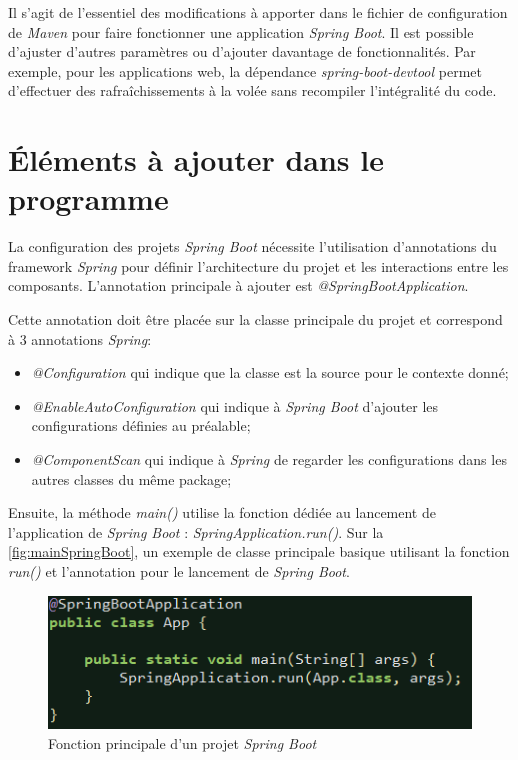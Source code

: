 \documentclass{polytech/polytech}
\begin{document}
Il s’agit de l’essentiel des modifications à apporter dans le fichier de configuration de \textit{Maven} pour faire fonctionner une application \textit{Spring Boot}. Il est possible d’ajuster d’autres paramètres ou d’ajouter davantage de fonctionnalités. Par exemple, pour les applications web, la dépendance \textit{spring-boot-devtool} permet d’effectuer des rafraîchissements à la volée sans recompiler l’intégralité du code. 


\section{Éléments à ajouter dans le programme}
\label{sec:elementsSpringBoot}

La configuration des projets \textit{Spring Boot} nécessite l’utilisation d’annotations du framework \textit{Spring} pour définir l’architecture du projet et les interactions entre les composants. L’annotation principale à ajouter est \textit{@SpringBootApplication}.


Cette annotation doit être placée sur la classe principale du projet et correspond à 3 annotations \textit{Spring}:
\begin{itemize}
	\item \textit{@Configuration} qui indique que la classe est la source pour le contexte donné;
	\item \textit{@EnableAutoConfiguration} qui indique à \textit{Spring Boot} d’ajouter les configurations définies au préalable;
	\item \textit{@ComponentScan} qui indique à \textit{Spring} de regarder les configurations dans les autres classes du même package;
\end{itemize}

Ensuite, la méthode \textit{main()} utilise la fonction dédiée au lancement de l’application de \textit{Spring Boot} : \textit{SpringApplication.run()}. Sur la \autoref{fig:mainSpringBoot}, un exemple de classe principale basique utilisant la fonction \textit{run()} et l’annotation pour le lancement de \textit{Spring Boot}.

\begin{figure}
	\includegraphics[scale=1]{images/mainSpringBoot}
	\caption{Fonction principale d'un projet \textit{Spring Boot}}
	\label{fig:mainSpringBoot}
\end{figure}
\end{document}
